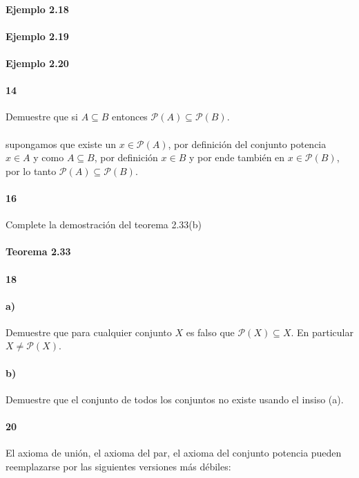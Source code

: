 \documentclass{article}
\begin{document}
\paragraph{Ejemplo 2.18}
\paragraph{Ejemplo 2.19}
\paragraph{Ejemplo 2.20}
\paragraph{14} Demuestre que si $A \subseteq B$ entonces $\mathcal{P}(A) \subseteq \mathcal{P}(B)$.
\paragraph{} supongamos que existe un $x \in \mathcal{P}(A)$, por definición del conjunto potencia $x \in A$ y como $A \subseteq B$, por definición $x \in B$ y por ende también en $x \in \mathcal{P}(B)$, por lo tanto $\mathcal{P}(A) \subseteq \mathcal{P}(B)$.
\paragraph{16} Complete la demostración del teorema 2.33(b)
\paragraph{Teorema 2.33}
\paragraph{18}
\paragraph{a)} Demuestre que para cualquier conjunto $X$ es falso que $\mathcal{P}(X) \subseteq X$. En particular $X \neq \mathcal{P}(X)$.
\paragraph{b)} Demuestre que el conjunto de todos los conjuntos no existe usando el insiso (a).
\paragraph{20} El axioma de unión, el axioma del par, el axioma del conjunto potencia pueden reemplazarse por las siguientes versiones más débiles:
\end{document}
